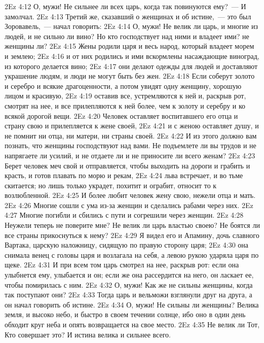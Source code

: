 \vs 2Ez 4:12 О, мужи! Не сильнее ли всех царь, когда так повинуются ему?~--- И замолчал.
\rsbpar\vs 2Ez 4:13 Третий же, сказавший о женщинах и об истине,~--- это был Зоровавель,~--- начал говорить:
\vs 2Ez 4:14 О, мужи! Не велик ли царь, и многие из людей, и не сильно ли вино? Но кто господствует над ними и владеет ими? не женщины ли?
\vs 2Ez 4:15 Жены родили царя и весь народ, который владеет морем и землею;
\vs 2Ez 4:16 и от них родились и ими вскормлены насаждающие виноград, из которого делается вино;
\vs 2Ez 4:17 они делают одежды для людей и доставляют украшение людям, и люди не могут быть без жен.
\vs 2Ez 4:18 Если соберут золото и серебро и всякие драгоценности, а потом увидят одну женщину, хорошую лицом и красивую,
\vs 2Ez 4:19 оставив все, устремляются к ней и, раскрыв рот, смотрят на нее, и все прилепляются к ней более, чем к золоту и серебру и ко всякой дорогой вещи.
\vs 2Ez 4:20 Человек оставляет воспитавшего его отца и страну свою и прилепляется к жене своей,
\vs 2Ez 4:21 и с женою оставляет душу, и не помнит ни отца, ни матери, ни страны своей.
\vs 2Ez 4:22 И из этого должно вам познать, что женщины господствуют над вами. Не подъемлете ли вы трудов и не напрягаете ли усилий, и не отдаете ли и не приносите ли всего женам?
\vs 2Ez 4:23 Берет человек меч свой и отправляется, чтобы выходить на дороги и грабить и красть, и готов плавать по морю и рекам,
\vs 2Ez 4:24 льва встречает, и во тьме скитается; но лишь только украдет, похитит и ограбит, относит то к возлюбленной.
\vs 2Ez 4:25 И более любит человек жену свою, нежели отца и мать.
\vs 2Ez 4:26 Многие сошли с ума из-за женщин и сделались рабами через них.
\vs 2Ez 4:27 Многие погибли и сбились с пути и согрешили через женщин.
\vs 2Ez 4:28 Неужели теперь не поверите мне? Не велик ли царь властью своею? Не боятся ли все страны прикоснуться к нему?
\vs 2Ez 4:29 Я видел его и Апамину, дочь славного Вартака, царскую наложницу, сидящую по правую сторону царя;
\vs 2Ez 4:30 она снимала венец с головы царя и возлагала на себя, а левою рукою ударяла царя по щеке.
\vs 2Ez 4:31 И при всем том царь смотрел на нее, раскрыв рот: если она улыбнется ему, улыбается и он; если же она рассердится на него, он ласкает ее, чтобы помирилась с ним.
\vs 2Ez 4:32 О, мужи! Как же не сильны женщины, когда так поступают они?
\vs 2Ez 4:33 Тогда царь и вельможи взглянули друг на друга, а он начал говорить об истине.
\vs 2Ez 4:34 О, мужи! Не сильны ли женщины? Велика земля, и высоко небо, и быстро в своем течении солнце, ибо оно в один день обходит круг неба и опять возвращается на свое место.
\vs 2Ez 4:35 Не велик ли Тот, Кто совершает это? И истина велика и сильнее всего.
